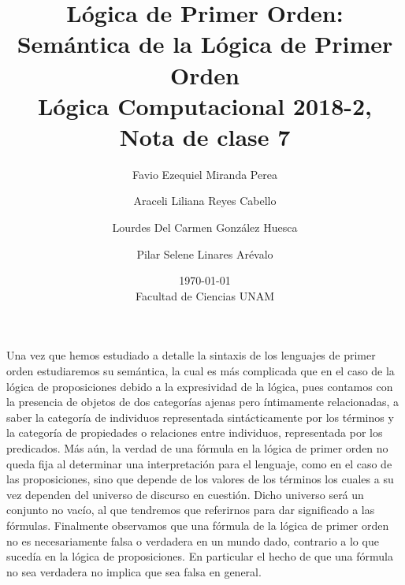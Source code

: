 \documentclass[11pt,letterpaper]{article}
\title{Lógica de Primer Orden: Semántica de la Lógica de Primer Orden \\ 
L\'ogica Computacional 2018-2, Nota de clase 7}
\author{Favio Ezequiel Miranda Perea\and Araceli Liliana Reyes Cabello\and
Lourdes Del Carmen Gonz\'alez Huesca \and Pilar Selene Linares Ar\'evalo}
\date{\today\\ Facultad de Ciencias UNAM}
\begin{document}
\maketitle

Una vez que hemos estudiado a detalle la sintaxis de los lenguajes de primer
orden estudiaremos su semántica, la cual es más complicada que en
el caso de la lógica de proposiciones debido a la expresividad de la lógica, pues contamos con la presencia de objetos de
dos categorías ajenas pero íntimamente relacionadas, a saber la
categoría de individuos representada sintácticamente por los términos
y la categoría de propiedades o relaciones entre individuos,
representada por los predicados.
Más aún, la verdad de una fórmula
en la lógica de primer orden no queda fija al determinar una interpretación para el lenguaje, 
 como en el caso de las proposiciones, sino que depende de
los valores de los términos los cuales a su vez dependen del universo
de discurso en cuestión. Dicho universo 
será un conjunto no vacío, al que tendremos que referirnos para
dar significado a las fórmulas. Finalmente observamos que una fórmula
de la lógica de primer orden no es necesariamente falsa o verdadera en un
mundo  dado, contrario a lo que sucedía en la lógica de
proposiciones. En particular el hecho de que una fórmula no sea verdadera no implica que sea
falsa en general.\\



\end{document}
